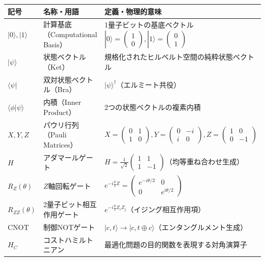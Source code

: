 \documentclass[11pt,a4paper,oneside,openany]{ltjsbook}
\theoremstyle{definition}
\theoremstyle{plain}
\theoremstyle{remark}
\newcommand{\ket}[1]{|#1\rangle}
\newcommand{\bra}[1]{\langle#1|}
\newcommand{\braket}[2]{\langle#1|#2\rangle}
\begin{document}
\begin{table}[htbp]
\centering
\begin{tabularx}{\textwidth}{l p{5cm} X}
\toprule
\textbf{記号} & \textbf{名称・用語} & \textbf{定義・物理的意味} \\
\midrule
$\ket{0}, \ket{1}$ & 計算基底（Computational Basis） & 1量子ビットの基底ベクトル $\ket{0} = \begin{pmatrix} 1 \\ 0 \end{pmatrix}, \ket{1} = \begin{pmatrix} 0 \\ 1 \end{pmatrix}$ \\
$\ket{\psi}$ & 状態ベクトル（Ket） & 規格化されたヒルベルト空間の純粋状態ベクトル \\
$\bra{\psi}$ & 双対状態ベクトル（Bra） & $\ket{\psi}^\dagger$（エルミート共役） \\
$\braket{\phi}{\psi}$ & 内積（Inner Product） & 2つの状態ベクトルの複素内積 \\
$X, Y, Z$ & パウリ行列（Pauli Matrices） & $X = \begin{pmatrix} 0 & 1 \\ 1 & 0 \end{pmatrix}, Y = \begin{pmatrix} 0 & -i \\ i & 0 \end{pmatrix}, Z = \begin{pmatrix} 1 & 0 \\ 0 & -1 \end{pmatrix}$ \\
$H$ & アダマールゲート & $H = \frac{1}{\sqrt{2}}\begin{pmatrix} 1 & 1 \\ 1 & -1 \end{pmatrix}$（均等重ね合わせ生成） \\
$R_Z(\theta)$ & $Z$軸回転ゲート & $e^{-i \frac{\theta}{2} Z} = \begin{pmatrix} e^{-i\theta/2} & 0 \\ 0 & e^{i\theta/2} \end{pmatrix}$ \\
$R_{ZZ}(\theta)$ & 2量子ビット相互作用ゲート & $e^{-i \frac{\theta}{2} Z_i Z_j}$（イジング相互作用項） \\
$\text{CNOT}$ & 制御NOTゲート & $\ket{c, t} \to \ket{c, t \oplus c}$（エンタングルメント生成） \\
$H_C$ & コストハミルトニアン & 最適化問題の目的関数を表現する対角演算子 \\

\end{tabularx}
\end{table}
\end{document}
